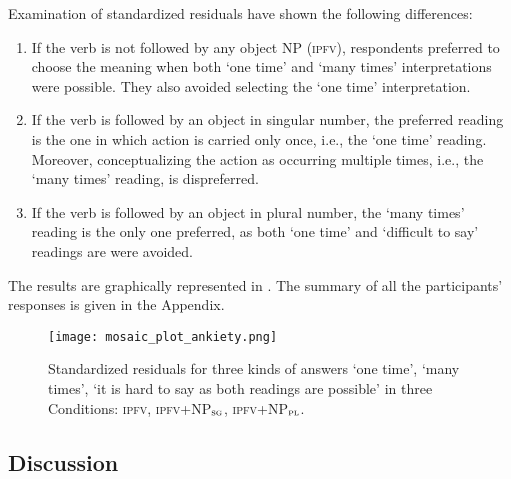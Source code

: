 \documentclass[output=paper]{langscibook}
\begin{document}
Examination of standardized residuals have shown the following differences:

\begin{enumerate}
\item If the verb is not followed by any object NP (\textsc{ipfv}), respondents preferred to choose the meaning when both ‘one time’ and ‘many times’ interpretations were possible. They also avoided selecting the ‘one time’ interpretation.
\item If the verb is followed by an object in singular number, the preferred reading is the one in which action is carried only once, i.e., the ‘one time' reading. Moreover, conceptualizing the action as occurring multiple times, i.e., the ‘many times' reading, is dispreferred.
\item If the verb is followed  by an object in plural number, the ‘many times’ reading is the only one preferred, as both ‘one time’ and ‘difficult to say’ readings are were avoided.
\end{enumerate}

The results are graphically represented in . The summary of all the participants’ responses is given in the Appendix.

\begin{figure}[p]
\centering
\texttt{[image: mosaic\_plot\_ankiety.png]}
\caption{Standardized residuals for three kinds of answers ‘one time’, ‘many times’, ‘it is hard to say as both readings are possible’ in three Conditions: \textsc{ipfv}, \textsc{ipfv}+NP$_\textsc{sg}$, \textsc{ipfv}+NP$_\textsc{pl}$.}\label{jan-bla:fansb:kb:fig1}
\end{figure}

\subsection{Discussion}\label{jan-bla:fansb:kb:sec3.3}
\end{document}
